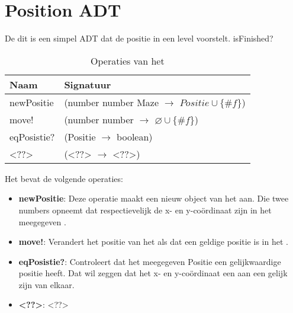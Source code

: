 \section{Position ADT}
\label{section:positie}

De \texttt{} dit is een simpel ADT dat de positie in een level voorstelt.
isFinished?

\begin{table}[hbt]
\centering
\begin{tabular}{|ll|}
\hline
\rowcolor[HTML]{000000} 
{\color[HTML]{FFFFFF} \textbf{Naam}} & {\color[HTML]{FFFFFF} \textbf{Signatuur}} \\ \hline
newPositie                          & (number number Maze $\rightarrow$ $Positie\cup\{\#f\}$)                                       \\ \hline
move!                                & (number number $\rightarrow$ $\varnothing\cup\{\#f\}$)                                       \\ \hline
 eqPosistie?                                & (Positie $\rightarrow$ boolean)                                       \\ \hline
 <??>                                & (<??> $\rightarrow$ <??>)                                       \\ \hline
\end{tabular}
\caption{Operaties van het \texttt{}}
\label{table:positie}
\end{table}

Het \texttt{} bevat de volgende operaties:

\begin{itemize}
	\item \textbf{newPositie}: Deze operatie maakt een nieuw object van het \texttt{} aan. 
		Die twee numbers opneemt dat respectievelijk de x- en y-co\"ordinaat zijn in het meegegeven \texttt{}.
	\item \textbf{move!}: Verandert het positie van het \texttt{} als dat een geldige positie is in het \texttt{}.
	\item \textbf{eqPosistie?}: Controleert dat het meegegeven Positie een gelijkwaardige positie heeft.
		Dat wil zeggen dat het x- en y-co\"ordinaat een aan een gelijk zijn van elkaar. 
	\item \textbf{<??>}: <??>
\end{itemize}

